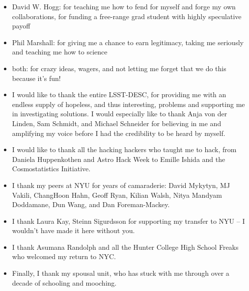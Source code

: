 \begin{itemize}
	\item David W. Hogg: for teaching me how to fend for myself and forge my own collaborations, for funding a free-range grad student with highly speculative payoff
	\item Phil Marshall: for giving me a chance to earn legitimacy, taking me seriously and teaching me how to science
	\item both: for crazy ideas, wagers, and not letting me forget that we do this because it’s fun!
	\item I would like to thank the entire LSST-DESC, for providing me with an endless supply of hopeless, and thus interesting, problems and supporting me in investigating solutions. 
	I would especially like to thank Anja von der Linden, Sam Schmidt, and Michael Schneider for believing in me and amplifying my voice before I had the credibility to be heard by myself.
	\item I would like to thank all the hacking hackers who taught me to hack, from Daniela Huppenkothen and Astro Hack Week to Emille Ishida and the Cosmostatistics Initiative.
	\item I thank my peers at NYU for years of camaraderie: David Mykytyn, MJ Vakili, ChangHoon Hahn, Geoff Ryan, Kilian Walsh, Nitya Mandyam Doddamane, Dun Wang, and Dan Foreman-Mackey.
	\item I thank Laura Kay, Steinn Sigurdsson for supporting my transfer to NYU -- I wouldn't have made it here without you.
	\item I thank Asumana Randolph and all the Hunter College High School Freaks who welcomed my return to NYC.
	\item Finally, I thank my spousal unit, who has stuck with me through over a decade of schooling and mooching.
\end{itemize}